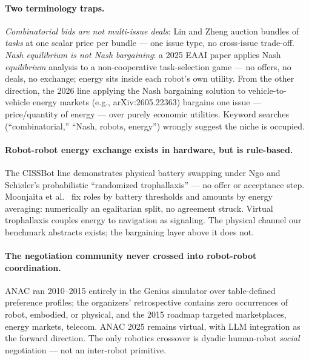 \documentclass[sigconf,nonacm]{acmart}
\begin{document}
\paragraph{Two terminology traps.} \emph{Combinatorial bids are not
multi-issue deals}: Lin and Zheng \cite{lin2005combinatorial} auction
bundles of \emph{tasks} at one scalar price per bundle --- one issue type,
no cross-issue trade-off. \emph{Nash equilibrium is not Nash bargaining}: a
2025 EAAI paper \cite{hamidoglu2025nash} applies Nash \emph{equilibrium}
analysis to a non-cooperative task-selection game --- no offers, no deals,
no exchange; energy sits inside each robot's own utility. From the other
direction, the 2026 line applying the Nash bargaining solution to
vehicle-to-vehicle energy markets (e.g., arXiv:2605.22363) bargains one
issue --- price/quantity of energy --- over purely economic utilities.
Keyword searches (``combinatorial,'' ``Nash, robots, energy'') wrongly
suggest the niche is occupied.

\paragraph{Robot-robot energy exchange exists in hardware, but is
rule-based.} The CISSBot line demonstrates physical battery swapping
\cite{schioler2008trophallaxis} under Ngo and Schi{\o}ler's probabilistic
``randomized trophallaxis'' \cite{ngo2007randomized} --- no offer or
acceptance step. Moonjaita et al.\ \cite{moonjaita2018trophallaxis} fix
roles by battery thresholds and amounts by energy averaging: numerically an
egalitarian split, no agreement struck. Virtual trophallaxis
\cite{schmickl2008trophallaxis} couples energy to navigation as signaling.
The physical channel our benchmark abstracts exists; the bargaining layer
above it does not.

\paragraph{The negotiation community never crossed into robot-robot
coordination.} ANAC ran 2010--2015 entirely in the Genius simulator over
table-defined preference profiles; the organizers' retrospective
\cite{baarslag2015anac} contains zero occurrences of robot, embodied, or
physical, and the 2015 roadmap targeted marketplaces, energy markets,
telecom. ANAC 2025 \cite{aydogan2026anac} remains virtual, with LLM
integration as the forward direction. The only robotics crossover is dyadic
human-robot \emph{social} negotiation \cite{aydogan2022jennifer} --- not an
inter-robot primitive.
\end{document}
